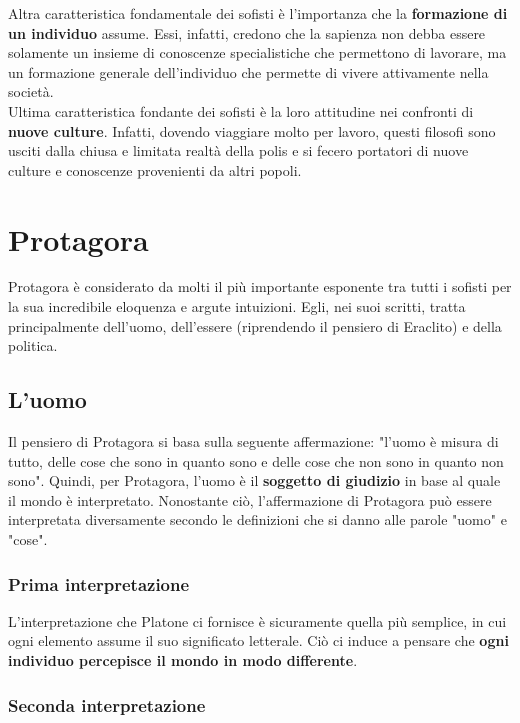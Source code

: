 \documentclass[10pt,a4paper]{article}
\begin{document}
	 Altra caratteristica fondamentale dei sofisti è l'importanza che la \textbf{formazione di un individuo} assume. Essi, infatti, credono che la sapienza non debba essere solamente un insieme di conoscenze specialistiche che permettono di lavorare, ma un formazione generale dell'individuo che permette di vivere attivamente nella società.\\
	 
	 Ultima caratteristica fondante dei sofisti è la loro attitudine nei confronti di \textbf{nuove culture}. Infatti, dovendo viaggiare molto per lavoro, questi filosofi sono usciti dalla chiusa e limitata realtà della polis e si fecero portatori di nuove culture e conoscenze provenienti da altri popoli.
	
	\section{Protagora}
	
	Protagora è considerato da molti il più importante esponente tra tutti i sofisti per la sua incredibile eloquenza e argute intuizioni. Egli, nei suoi scritti, tratta principalmente dell'uomo, dell'essere (riprendendo il pensiero di Eraclito) e della politica. 
	
	\subsection{L'uomo}
	
	Il pensiero di Protagora si basa sulla seguente affermazione: "l'uomo è misura di tutto, delle cose che sono in quanto sono e delle cose che non sono in quanto non sono". Quindi, per Protagora, l'uomo è il \textbf{soggetto di giudizio} in base al quale il mondo è interpretato. Nonostante ciò, l'affermazione di Protagora può essere interpretata diversamente secondo le definizioni che si danno alle parole "uomo" e "cose".\\
	
	\subsubsection{Prima interpretazione}
	
	L'interpretazione che Platone ci fornisce è sicuramente quella più semplice, in cui ogni elemento assume il suo significato letterale. Ciò ci induce a pensare che \textbf{ogni individuo percepisce il mondo in modo differente}.
	
	\subsubsection{Seconda interpretazione}
	
\end{document}
